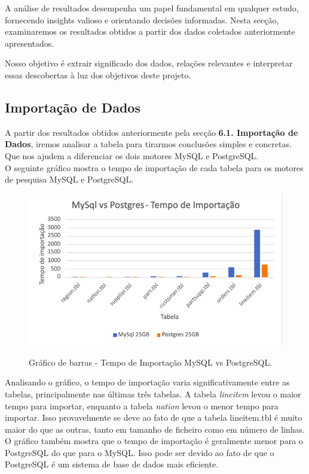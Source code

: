 \documentclass{article}
\begin{document}
\quad A análise de resultados desempenha um papel fundamental em qualquer estudo, fornecendo insights valioso e orientando decisões informadas. Nesta secção, examinaremos os resultados obtidos a partir dos dados coletados anteriormente apresentados. 

\quad Nosso objetivo é extrair significado dos dados, relações relevantes e interpretar essas descobertas à luz dos objetivos deste projeto.\\
\subsection{Importação de Dados}
\quad A partir dos resultados obtidos anteriormente pela secção \textbf{6.1. Importação de Dados}, iremos analisar a tabela para tirarmos conclusões simples e concretas. Que nos ajudem a diferenciar os dois motores MySQL e PostgreSQL.\\

\quad O seguinte gráfico mostra o tempo de importação de cada tabela para os motores de pesquisa MySQL e PostgreSQL. 


\begin{figure}[H]
  \centering
  \includegraphics[width=\textwidth]{Graphs/ImportTime.png}\\
  \caption{Gráfico de barras - Tempo de Importação MySQL vs PostgreSQL.}
  \label{fig:row_import_time}
\end{figure}
Analisando o gráfico, o tempo de importação varia significativamente entre as tabelas, principalmente nas últimas três tabelas. A tabela \textit{lineitem} levou o maior tempo para importar, enquanto a tabela \textit{nation} levou o menor tempo para importar.
Isso provavelmente se deve ao fato de que a tabela lineitem.tbl é muito maior do que as outras, tanto em tamanho de ficheiro como em número de linhas.\\
\quad O gráfico também mostra que o tempo de importação é geralmente menor para o PostgreSQL do que para o MySQL. Isso pode ser devido ao fato de que o PostgreSQL é um sistema de base de dados mais eficiente.
\end{document}
